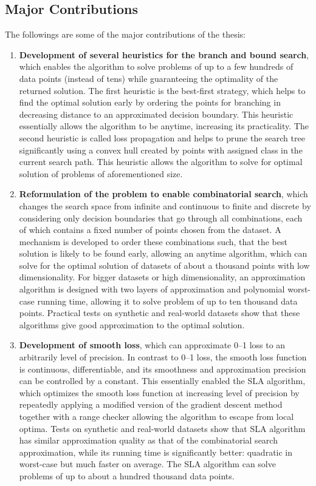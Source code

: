 \subsection{Major Contributions}
\label{sec:intro.contributions}

The followings are some of the major contributions of the thesis:

\begin{enumerate}[ (i)]

\item {\bf Development of several heuristics for the branch and bound search}, which enables the algorithm to solve problems of up to a few hundreds of data points (instead of tens) while guaranteeing the optimality of the returned solution. The first heuristic is the best-first strategy, which helps to find the optimal solution early by ordering the points for branching in decreasing distance to an approximated decision boundary. This heuristic essentially allows the algorithm to be anytime, increasing its practicality. The second heuristic is called loss propagation and helps to prune the search tree significantly using a convex hull created by points with assigned class in the current search path. This heuristic allows the algorithm to solve for optimal solution of problems of aforementioned size. 
 
\item {\bf Reformulation of the problem to enable combinatorial search}, which changes the search space from infinite and continuous to finite and discrete by considering only decision boundaries that go through all combinations, each of which contains a fixed number of points chosen from the dataset. A mechanism is developed to order these combinations such, that the best solution is likely to be found early, allowing an anytime algorithm, which can solve for the optimal solution of datasets of about a thousand points with low dimensionality. For bigger datasets or high dimensionality, an approximation algorithm is designed with two layers of approximation and polynomial worst-case running time, allowing it to solve problem of up to ten thousand data points. Practical tests on synthetic and real-world datasets show that these algorithms give good approximation to the optimal solution. 

\item {\bf Development of smooth loss}, which can approximate 0--1 loss to an arbitrarily level of precision. In contrast to 0--1 loss, the smooth loss function is continuous, differentiable, and its smoothness and approximation precision can be controlled by a constant. This essentially enabled the SLA algorithm, which optimizes the smooth loss function at increasing level of precision by repeatedly applying a modified version of the gradient descent method together with a range checker allowing the algorithm to escape from local optima. Tests on synthetic and real-world datasets show that SLA algorithm has similar approximation quality as that of the combinatorial search approximation, while its running time is significantly better: quadratic in worst-case but much faster on average. The SLA algorithm can solve problems of up to about a hundred thousand data points. 


\end{enumerate}
